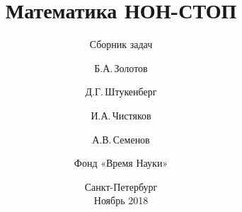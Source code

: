 \subject{\large\rm
	При поддежке Фонда Президентских грантов
	\vspace{1in}}

\title{\fontsize{25}{25}\selectfont
	Математика НОН-СТОП}
\subtitle{\fontsize{18}{18}\selectfont
	Сборник задач
	\vspace{0.7in}}

\author{Б.А.\,Золотов \and Д.Г.\,Штукенберг \\
	\and И.А.\,Чистяков \and А.В.\,Семенов \\
	\and Фонд «Время Науки»
	\vspace{1in}}

\date{Санкт-Петербург \\ Ноябрь 2018}